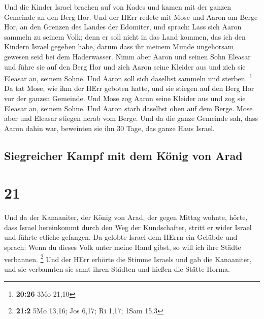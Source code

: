  Und die Kinder Israel brachen auf von Kades und kamen
mit der ganzen Gemeinde an den Berg Hor.  Und der HErr
redete mit Mose und Aaron am Berge Hor, an den Grenzen des Landes der
Edomiter, und sprach:  Lass sich Aaron sammeln zu seinem
Volk; denn er soll nicht in das Land kommen, das ich den Kindern Israel
gegeben habe, darum dass ihr meinem Munde ungehorsam gewesen seid bei
dem Haderwasser.  Nimm aber Aaron und seinen Sohn Eleasar
und führe sie auf den Berg Hor  und zieh Aaron seine
Kleider aus und zieh sie Eleasar an, seinem Sohne. Und Aaron soll sich
daselbst sammeln und sterben. \footnote{\textbf{20:26} 3Mo 21,10}
 Da tat Mose, wie ihm der HErr geboten hatte, und sie
stiegen auf den Berg Hor vor der ganzen Gemeinde.  Und
Mose zog Aaron seine Kleider aus und zog sie Eleasar an, seinem Sohne.
Und Aaron starb daselbst oben auf dem Berge. Mose aber und Eleasar
stiegen herab vom Berge.  Und da die ganze Gemeinde sah,
dass Aaron dahin war, beweinten sie ihn 30 Tage, das ganze Haus Israel.

\hypertarget{siegreicher-kampf-mit-dem-kuxf6nig-von-arad}{%
\subsection{Siegreicher Kampf mit dem König von
Arad}\label{siegreicher-kampf-mit-dem-kuxf6nig-von-arad}}

\hypertarget{section-20}{%
\section{21}\label{section-20}}

 Und da der Kanaaniter, der König von Arad, der gegen
Mittag wohnte, hörte, dass Israel hereinkommt durch den Weg der
Kundschafter, stritt er wider Israel und führte etliche gefangen.
 Da gelobte Israel dem HErrn ein Gelübde und sprach: Wenn
du dieses Volk unter meine Hand gibst, so will ich ihre Städte
verbannen. \footnote{\textbf{21:2} 5Mo 13,16; Jos 6,17; Ri 1,17; 1Sam
  15,3}  Und der HErr erhörte die Stimme Israels und gab
die Kanaaniter, und sie verbannten sie samt ihren Städten und hießen die
Stätte Horma.

